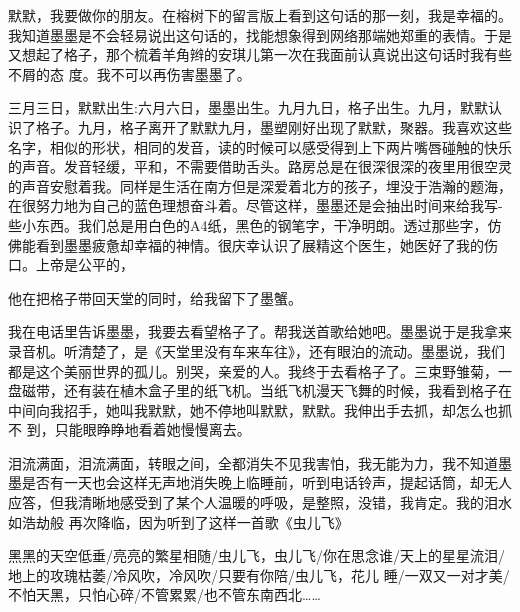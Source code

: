 \documentclass{article}
\begin{document}
\newpage

默默，我要做你的朋友。在榕树下的留言版上看到这句话的那一刻，我是幸福的。我知道墨墨是不会轻易说出这句话的，找能想象得到网络那端她郑重的表情。于是又想起了格子，那个梳着羊角辫的安琪儿第一次在我面前认真说出这句话时我有些不屑的态
度。我不可以再伤害墨墨了。 

三月三日，默默出生:六月六日，墨墨出生。九月九日，格子出生。九月，默默认识了格子。九月，格子离开了默默九月，墨塑刚好出现了默默，聚器。我喜欢这些名字，相似的形状，相同的发音，读的时候可以感受得到上下两片嘴唇碰触的快乐的声音。发音轻缓，平和，不需要借助舌头。路房总是在很深很深的夜里用很空灵的声音安慰着我。同样是生活在南方但是深爱着北方的孩子，埋没于浩瀚的题海，在很努力地为自己的蓝色理想奋斗着。尽管这样，墨墨还是会抽出时间来给我写-些小东西。我们总是用白色的A4纸，黑色的钢笔字，干净明朗。透过那些字，仿佛能看到墨墨疲惫却幸福的神情。很庆幸认识了展精这个医生，她医好了我的伤口。上帝是公平的，

\newpage
他在把格子带回天堂的同时，给我留下了墨蟹。 

我在电话里告诉墨墨，我要去看望格子了。帮我送首歌给她吧。墨墨说于是我拿来录音机。听清楚了，是《天堂里没有车来车往》，还有眼泊的流动。墨墨说，我们都是这个美丽世界的孤儿。别哭，亲爱的人。我终于去看格子了。三束野雏菊，一盘磁带，还有装在植木盒子里的纸飞机。当纸飞机漫天飞舞的时候，我看到格子在中间向我招手，她叫我默默，她不停地叫默默，默默。我伸出手去抓，却怎么也抓不
到，只能眼睁睁地看着她慢慢离去。 

泪流满面，泪流满面，转眼之间，全都消失不见我害怕，我无能为力，我不知道墨墨是否有一天也会这样无声地消失晚上临睡前，听到电话铃声，提起话筒，却无人应答，但我清晰地感受到了某个人温暖的呼吸，是整照，没错，我肯定。我的泪水如浩劫般
再次降临，因为听到了这样一首歌《虫儿飞》 

黑黑的天空低垂/亮亮的繁星相随/虫儿飞，虫儿飞/你在思念谁/天上的星星流泪/地上的攻瑰枯萎/冷风吹，冷风吹/只要有你陪/虫儿飞，花儿
\newpage
睡/一双又一对才美/不怕天黑，只怕心碎/不管累累/也不管东南西北……
\end{document}
